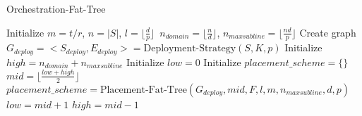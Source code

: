 \begin{algorithm}[!h]
\small
\caption{Orchestration-Fat-Tree}
\label{alg:orchestration-fat-tree}
 Initialize $m=t/r$, $n=|S|$, $l=\lfloor\frac{d}{p}\rfloor$\, $n_{domain}=\lfloor\frac{n}{d}\rfloor$, $n_{maxsubline}=\lfloor\frac{nd}{p}\rfloor$\;
 Create graph $G_{deploy}=<S_{deploy},E_{deploy}>=\text{Deployment-Strategy}(S,K,p)$\;
 Initialize $high=n_{domain}+n_{maxsubline}$\;
 Initialize $low=0$\;
 Initialize $placement\_scheme=\{\}$\;
{
     $mid=\lfloor \frac{low+high}{2} \rfloor$\;
     $placement\_scheme=\text{Placement-Fat-Tree}(G_{deploy},mid,F,l,m,n_{maxsubline},d,p)$\;
    {
         $low=mid+1$\;
    }
    {
         $high=mid-1$\;
    }
}
    
{
}
{
}
\end{algorithm}

